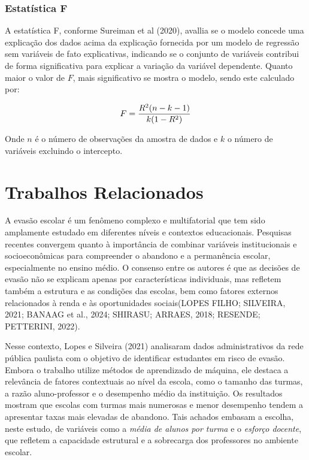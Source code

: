 \documentclass[english, spanish, brazilian]{RBIEarticle} %
\begin{document}
\subsubsection{Estatística F}
A estatística F, conforme Sureiman et al (2020), avallia se o modelo concede uma explicação dos dados acima da explicação fornecida por um modelo de regressão sem variáveis de fato explicativas, indicando se o conjunto de variáveis contribui de forma significativa para explicar a variação da variável dependente. Quanto maior o valor de $F$, mais significativo se mostra o modelo, sendo este calculado por:

\vspace{0.5cm}
\begin{equation}
\large F = \frac{R^2(n-k-1)}{k(1 - R^2)}
\end{equation}
\vspace{0.5cm}

Onde $n$ é o número de observações da amostra de dados e $k$ o número de variáveis excluindo o intercepto.


\section{Trabalhos Relacionados}

A evasão escolar é um fenômeno complexo e multifatorial que tem sido amplamente estudado em diferentes níveis e contextos educacionais. Pesquisas recentes convergem quanto à importância de combinar variáveis institucionais e socioeconômicas para compreender o abandono e a permanência escolar, especialmente no ensino médio. O consenso entre os autores é que as decisões de evasão não se explicam apenas por características individuais, mas refletem também a estrutura e as condições das escolas, bem como fatores externos relacionados à renda e às oportunidades sociais(LOPES FILHO; SILVEIRA, 2021; BANAAG et al., 2024; SHIRASU; ARRAES, 2018; RESENDE; PETTERINI, 2022).

Nesse contexto, Lopes e Silveira (2021) analisaram dados administrativos da rede pública paulista com o objetivo de identificar estudantes em risco de evasão. Embora o trabalho utilize métodos de aprendizado de máquina, ele destaca a relevância de fatores contextuais ao nível da escola, como o tamanho das turmas, a razão aluno-professor e o desempenho médio da instituição. Os resultados mostram que escolas com turmas mais numerosas e menor desempenho tendem a apresentar taxas mais elevadas de abandono. Tais achados embasam a escolha, neste estudo, de variáveis como a \textit{média de alunos por turma} e o \textit{esforço docente}, que refletem a capacidade estrutural e a sobrecarga dos professores no ambiente escolar.
\end{document}
